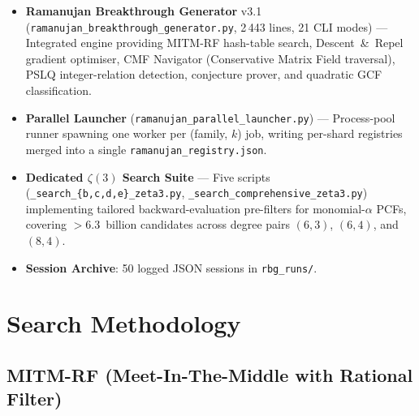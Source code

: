 \documentclass[11pt,a4paper]{article}
\begin{document}
\begin{itemize}[leftmargin=1.5em]
\item \textbf{Ramanujan Breakthrough Generator} v3.1
      (\texttt{ramanujan\_breakthrough\_generator.py}, 2\,443 lines, 21 CLI
      modes) --- Integrated engine providing MITM-RF hash-table search,
      Descent~\&~Repel gradient optimiser, CMF Navigator (Conservative Matrix
      Field traversal), PSLQ integer-relation detection, conjecture prover,
      and quadratic GCF classification.
\item \textbf{Parallel Launcher}
      (\texttt{ramanujan\_parallel\_launcher.py}) ---
      Process-pool runner spawning one worker per (family, $k$) job,
      writing per-shard registries merged into a single
      \texttt{ramanujan\_registry.json}.
\item \textbf{Dedicated $\zeta(3)$ Search Suite} --- Five scripts
      (\texttt{\_search\_\{b,c,d,e\}\_zeta3.py},
      \texttt{\_search\_comprehensive\_zeta3.py})
      implementing tailored backward-evaluation pre-filters for
      monomial-$\alpha$ PCFs, covering $>6.3$~billion candidates across
      degree pairs $(6,3)$, $(6,4)$, and $(8,4)$.
\item \textbf{Session Archive}: 50 logged JSON sessions in
      \texttt{rbg\_runs/}.
\end{itemize}

\section{Search Methodology}

\subsection{MITM-RF (Meet-In-The-Middle with Rational Filter)}
\end{document}
